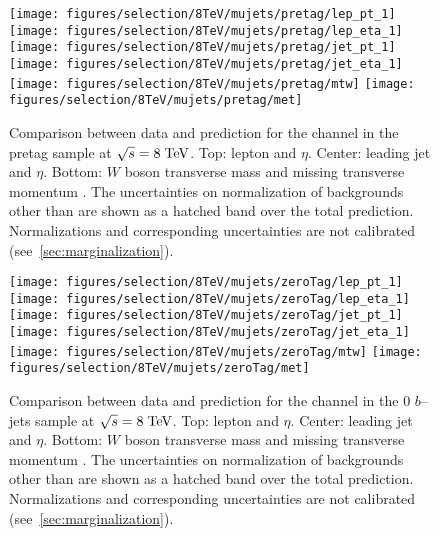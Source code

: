 \begin{figure}
  \centering
  \texttt{[image: figures/selection/8TeV/mujets/pretag/lep\_pt\_1]}
  \texttt{[image: figures/selection/8TeV/mujets/pretag/lep\_eta\_1]}
  \texttt{[image: figures/selection/8TeV/mujets/pretag/jet\_pt\_1]}
  \texttt{[image: figures/selection/8TeV/mujets/pretag/jet\_eta\_1]}
  \texttt{[image: figures/selection/8TeV/mujets/pretag/mtw]}
  \texttt{[image: figures/selection/8TeV/mujets/pretag/met]}
  \caption{
    Comparison between data and prediction for the \mujets{}
    channel in the pretag sample at $\sqrt{s} = 8 \; \mathrm{TeV}{}$. Top: lepton \pt{} and
    $\eta$. Center: leading jet \pt{} and $\eta$. Bottom: $W$ boson
    transverse mass \mtw{} and missing transverse momentum \met{}.
    The uncertainties on normalization of backgrounds other than
    \wjets{} are shown as a hatched band over the total prediction.
    Normalizations and corresponding uncertainties are not calibrated
    (see~\ref{sec:marginalization}).
  }
  \label{fig:2012mu_pretag}
\end{figure}
%
\begin{figure}
  \centering
  \texttt{[image: figures/selection/8TeV/mujets/zeroTag/lep\_pt\_1]}
  \texttt{[image: figures/selection/8TeV/mujets/zeroTag/lep\_eta\_1]}
  \texttt{[image: figures/selection/8TeV/mujets/zeroTag/jet\_pt\_1]}
  \texttt{[image: figures/selection/8TeV/mujets/zeroTag/jet\_eta\_1]}
  \texttt{[image: figures/selection/8TeV/mujets/zeroTag/mtw]}
  \texttt{[image: figures/selection/8TeV/mujets/zeroTag/met]}
  \caption{
    Comparison between data and prediction for the \mujets{}
    channel in the 0 $b$--jets sample at $\sqrt{s} = 8 \; \mathrm{TeV}{}$. Top: lepton \pt{} and
    $\eta$. Center: leading jet \pt{} and $\eta$. Bottom: $W$ boson
    transverse mass \mtw{} and missing transverse momentum \met{}.
    The uncertainties on normalization of backgrounds other than
    \wjets{} are shown as a hatched band over the total prediction.
    Normalizations and corresponding uncertainties are not calibrated
    (see~\ref{sec:marginalization}).
  }
  \label{fig:2012mu_0tag}
\end{figure}
%
